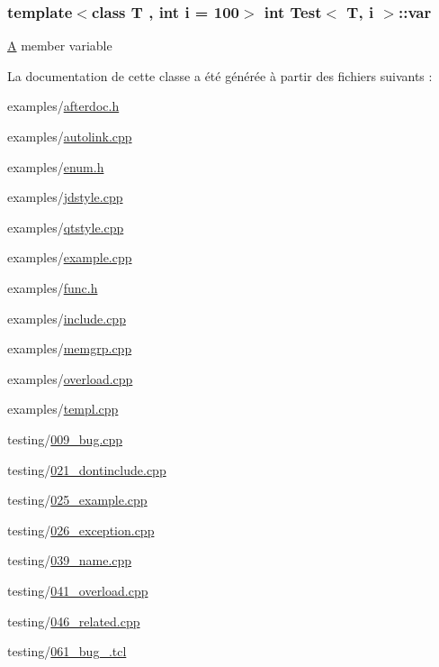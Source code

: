 \subsubsection[{var}]{\setlength{\rightskip}{0pt plus 5cm}template$<$class T , int i = 100$>$ int {\bf Test}$<$ T, {\bf i} $>$\+::var\hspace{0.3cm}{\ttfamily [protected]}}\label{class_test_ae75d55c8cf6390227d51c0965a4de296}
\hyperlink{class_a}{A} member variable 

La documentation de cette classe a été générée à partir des fichiers suivants \+:\begin{DoxyCompactItemize}
\item 
examples/\hyperlink{afterdoc_8h}{afterdoc.\+h}\item 
examples/\hyperlink{autolink_8cpp}{autolink.\+cpp}\item 
examples/\hyperlink{enum_8h}{enum.\+h}\item 
examples/\hyperlink{jdstyle_8cpp}{jdstyle.\+cpp}\item 
examples/\hyperlink{qtstyle_8cpp}{qtstyle.\+cpp}\item 
examples/\hyperlink{example_8cpp}{example.\+cpp}\item 
examples/\hyperlink{func_8h}{func.\+h}\item 
examples/\hyperlink{include_8cpp}{include.\+cpp}\item 
examples/\hyperlink{memgrp_8cpp}{memgrp.\+cpp}\item 
examples/\hyperlink{overload_8cpp}{overload.\+cpp}\item 
examples/\hyperlink{templ_8cpp}{templ.\+cpp}\item 
testing/\hyperlink{009__bug_8cpp}{009\+\_\+bug.\+cpp}\item 
testing/\hyperlink{021__dontinclude_8cpp}{021\+\_\+dontinclude.\+cpp}\item 
testing/\hyperlink{025__example_8cpp}{025\+\_\+example.\+cpp}\item 
testing/\hyperlink{026__exception_8cpp}{026\+\_\+exception.\+cpp}\item 
testing/\hyperlink{039__name_8cpp}{039\+\_\+name.\+cpp}\item 
testing/\hyperlink{041__overload_8cpp}{041\+\_\+overload.\+cpp}\item 
testing/\hyperlink{046__related_8cpp}{046\+\_\+related.\+cpp}\item 
testing/\hyperlink{061__bug__705503_8tcl}{061\+\_\+bug\+\_.\+tcl}\end{DoxyCompactItemize}
